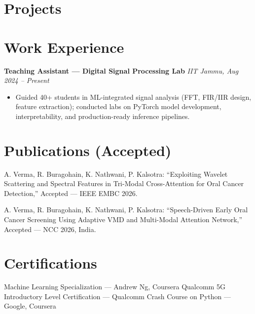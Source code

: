 \documentclass[9.5pt, letterpaper]{article}
\begin{document}
\section{Projects}

\section{Work Experience}
\textbf{Teaching Assistant --- Digital Signal Processing Lab} \hfill \textit{IIT Jammu, Aug 2024 -- Present}
\begin{itemize}
  \item Guided 40+ students in ML-integrated signal analysis (FFT, FIR/IIR design, feature extraction); conducted labs on PyTorch model development, interpretability, and production-ready inference pipelines.
\end{itemize}

\section{Publications (Accepted)}
\begin{enumerate}[label={[\arabic*]}, leftmargin=2em]
  \item A. Verma, R. Buragohain, K. Nathwani, P. Kalsotra: ``Exploiting Wavelet Scattering and Spectral Features in Tri-Modal Cross-Attention for Oral Cancer Detection,'' Accepted --- IEEE EMBC 2026.
  \item A. Verma, R. Buragohain, K. Nathwani, P. Kalsotra: ``Speech-Driven Early Oral Cancer Screening Using Adaptive VMD and Multi-Modal Attention Network,'' Accepted --- NCC 2026, India.
\end{enumerate}

\section{Certifications}
Machine Learning Specialization --- Andrew Ng, Coursera \hspace{1.5em}
Qualcomm 5G Introductory Level Certification --- Qualcomm \hspace{1.5em}
Crash Course on Python --- Google, Coursera%
\end{document}
